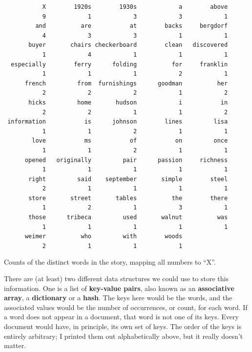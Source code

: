 \documentclass{article}
\begin{document}
\begin{table}
\begin{verbatim}
           X        1920s        1930s            a        above 
           9            1            3            3            1 
         and          are           at        backs     bergdorf 
           4            3            3            1            1 
       buyer       chairs checkerboard        clean   discovered 
           1            4            1            1            1 
  especially        ferry      folding          for     franklin 
           1            1            1            2            1 
      french         from  furnishings      goodman          her 
           2            2            2            1            2 
       hicks         home       hudson            i           in 
           2            2            1            1            2 
 information           is      johnson        lines         lisa 
           1            1            2            1            1 
        love           ms           of           on         once 
           1            1            2            1            1 
      opened   originally         pair      passion     richness 
           1            1            1            1            1 
       right         said    september       simple        steel 
           2            1            1            1            1 
       store       street       tables          the        there 
           1            2            1            3            1 
       those      tribeca         used       walnut          was 
           1            1            1            1            1 
      weimer          who         with        woods 
           2            1            1            1 
\end{verbatim}
  \caption{Counts of the distinct words in the story, mapping all numbers to ``X''.}
\label{table:wordcounts}
\end{table}

There are (at least) two different data structures we could use to store this
information.  One is a list of {\bf key-value pairs}, also known as an {\bf
  associative array}, a {\bf dictionary} or a {\bf hash}.  The keys here would
be the words, and the associated values would be the number of occurrences, or
count, for each word.  If a word does not appear in a document, that word is
not one of its keys.  Every document would have, in principle, its own set of
keys.  The order of the keys is entirely arbitrary; I printed them out
alphabetically above, but it really doesn't matter.
\end{document}
